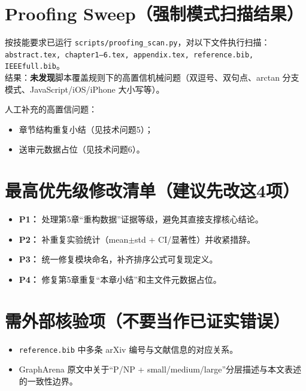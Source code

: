 \documentclass[12pt]{ctexart}
\begin{document}
\section*{Proofing Sweep（强制模式扫描结果）}
按技能要求已运行 \texttt{scripts/proofing\_scan.py}，对以下文件执行扫描：\texttt{abstract.tex, chapter1--6.tex, appendix.tex, reference.bib, IEEEfull.bib}。\\
结果：\textbf{未发现}脚本覆盖规则下的高置信机械问题（双逗号、双句点、arctan 分支模式、JavaScript/iOS/iPhone 大小写等）。

人工补充的高置信问题：
\begin{itemize}
  \item 章节结构重复小结（见技术问题5）；
  \item 送审元数据占位（见技术问题6）。
\end{itemize}

\section*{最高优先级修改清单（建议先改这4项）}
\begin{itemize}
  \item \textbf{P1：} 处理第5章“重构数据”证据等级，避免其直接支撑核心结论。
  \item \textbf{P2：} 补重复实验统计（mean$\pm$std + CI/显著性）并收紧措辞。
  \item \textbf{P3：} 统一修复模块命名，补齐排序公式可复现定义。
  \item \textbf{P4：} 修复第5章重复“本章小结”和主文件元数据占位。
\end{itemize}

\section*{需外部核验项（不要当作已证实错误）}
\begin{itemize}
  \item \texttt{reference.bib} 中多条 arXiv 编号与文献信息的对应关系。
  \item GraphArena 原文中关于“P/NP + small/medium/large”分层描述与本文表述的一致性边界。
\end{itemize}
\end{document}
